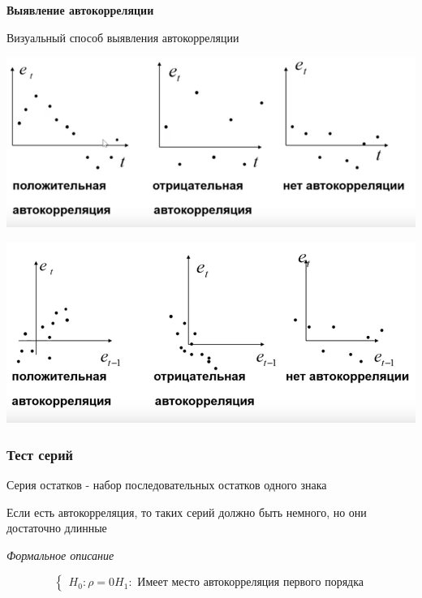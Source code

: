 \documentclass[a4paper, 12pt]{article}
\begin{document}
\begin{center}
    \textbf{Выявление автокорреляции}
\end{center}

Визуальный способ выявления автокорреляции

\includegraphics[scale = 0.5]{auto.png}

\includegraphics[scale = 0.5]{auto2.png}

\subsubsection{Тест серий}

Серия остатков - набор последовательных остатков одного знака

Если есть автокорреляция, то таких серий должно быть немного, но они достаточно длинные

\begin{center}
    \textit{Формальное описание}
\end{center}

\[\begin{cases}
    H_{0}: \rho = 0
    H_{1}: \textrm{ Имеет место автокорреляция первого порядка}
\end{cases}\]
\end{document}
